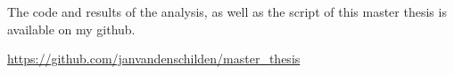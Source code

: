 The code and results of the analysis, as well as the script of this master thesis is available on my github.

\url{https://github.com/janvandenschilden/master_thesis}
